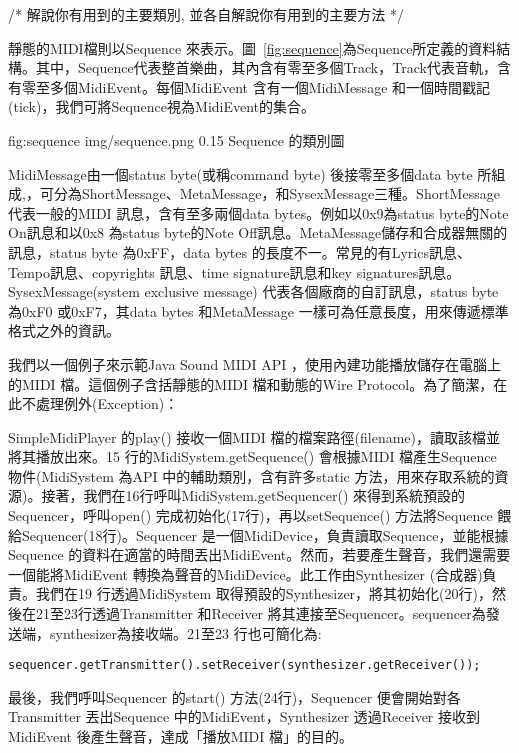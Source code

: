 \documentclass[12pt,a4paper,oneside]{report}
\begin{document}
/*
     解說你有用到的主要類別, 並各自解說你有用到的主要方法
*/


靜態的MIDI檔則以Sequence 來表示。圖~\ref{fig:sequence}為Sequence所定義的資料結構。其中，Sequence代表整首樂曲，其內含有零至多個Track，Track代表音軌，含有零至多個MidiEvent。每個MidiEvent 含有一個MidiMessage 和一個時間戳記(tick)，我們可將Sequence視為MidiEvent的集合。


\figurewithcaption
{fig:sequence}
{img/sequence.png}
{0.15}
{Sequence 的類別圖}

MidiMessage由一個status byte(或稱command byte) 後接零至多個data byte 所組成,，可分為ShortMessage、MetaMessage，和SysexMessage三種。ShortMessage代表一般的MIDI 訊息，含有至多兩個data bytes。例如以0x9為status byte的Note On訊息和以0x8 為status byte的Note Off訊息。MetaMessage儲存和合成器無關的訊息，status byte 為0xFF，data bytes 的長度不一。常見的有Lyrics訊息、Tempo訊息、copyrights 訊息、time signature訊息和key signatures訊息。SysexMessage(system exclusive message) 代表各個廠商的自訂訊息，status byte 為0xF0 或0xF7，其data bytes 和MetaMessage 一樣可為任意長度，用來傳遞標準格式之外的資訊。

我們以一個例子來示範Java Sound MIDI API ，使用內建功能播放儲存在電腦上的MIDI 檔。這個例子含括靜態的MIDI 檔和動態的Wire Protocol。為了簡潔，在此不處理例外(Exception)：



SimpleMidiPlayer 的play() 接收一個MIDI 檔的檔案路徑(filename)，讀取該檔並將其播放出來。15 行的MidiSystem.getSequence() 會根據MIDI 檔產生Sequence 物件(MidiSystem 為API 中的輔助類別，含有許多static 方法，用來存取系統的資源)。接著，我們在16行呼叫MidiSystem.getSequencer() 來得到系統預設的Sequencer，呼叫open() 完成初始化(17行)，再以setSequence() 方法將Sequence 餵給Sequencer(18行)。Sequencer 是一個MidiDevice，負責讀取Sequence，並能根據Sequence 的資料在適當的時間丟出MidiEvent。然而，若要產生聲音，我們還需要一個能將MidiEvent 轉換為聲音的MidiDevice。此工作由Synthesizer (合成器)負責。我們在19 行透過MidiSystem 取得預設的Synthesizer，將其初始化(20行)，然後在21至23行透過Transmitter 和Receiver 將其連接至Sequencer。sequencer為發送端，synthesizer為接收端。21至23 行也可簡化為:

\begin{verbatim}
sequencer.getTransmitter().setReceiver(synthesizer.getReceiver());
\end{verbatim}

最後，我們呼叫Sequencer 的start() 方法(24行)，Sequencer 便會開始對各Transmitter 丟出Sequence 中的MidiEvent，Synthesizer 透過Receiver 接收到MidiEvent 後產生聲音，達成「播放MIDI 檔」的目的。
\end{document}
